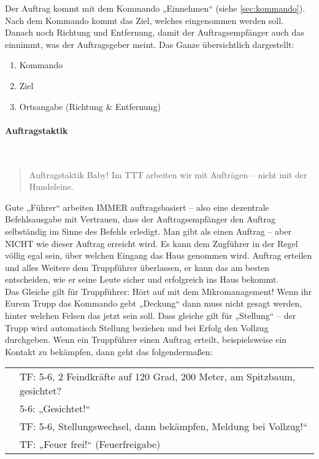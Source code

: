 Der Auftrag kommt mit dem Kommando „Einnehmen“ (siehe \ref{sec:kommando}). Nach dem Kommando kommt das Ziel, welches eingenommen werden soll. Danach noch Richtung und Entfernung, damit der Auftragsempfänger auch das einnimmt, was der Auftragsgeber meint. Das Ganze übersichtlich dargestellt:

\begin{enumerate}
	\item Kommando
	\item Ziel
	\item Ortsangabe (Richtung \& Entfernung)
\end{enumerate}

\paragraph*{Auftragstaktik}\ \\
\begin{quote}
	\glqq Auftragstaktik Baby! Im \ac{TTT} arbeiten wir mit Aufträgen -- nicht mit der Hundeleine.\grqq
\end{quote}
Gute „Führer“ arbeiten IMMER auftragsbasiert -- also eine dezentrale Befehlsausgabe mit Vertrauen, dass der Auftragsempfänger den Auftrag selbständig im Sinne des Befehls erledigt. Man gibt als einen Auftrag – aber NICHT wie dieser Auftrag erreicht wird. Es kann dem Zugführer in der Regel völlig egal sein, über welchen Eingang das Haus genommen wird. Auftrag erteilen und alles Weitere dem Truppführer überlassen, er kann das am besten entscheiden, wie er seine Leute sicher und erfolgreich ins Haus bekommt.\\

Das Gleiche gilt für Truppführer: Hört auf mit dem Mikromanagement! Wenn ihr Eurem Trupp das Kommando gebt „Deckung“ dann muss nicht gesagt werden, hinter welchen Felsen das jetzt sein soll. Dass gleiche gilt für „Stellung“ – der Trupp wird automatisch Stellung beziehen und bei Erfolg den Vollzug durchgeben. Wenn ein Truppführer einen Auftrag erteilt, beispielsweise ein Kontakt zu bekämpfen, dann geht das folgendermaßen:\\
\begin{tabular}{ll}
	& TF: 5-6, 2 Feindkräfte auf 120 Grad, 200 Meter, am Spitzbaum, gesichtet?\\
	& 5-6: „Gesichtet!“\\
	& TF: 5-6, Stellungswechsel, dann bekämpfen, Meldung bei Vollzug!“\\
	& TF: „Feuer frei!“ (Feuerfreigabe)\\
\end{tabular}



